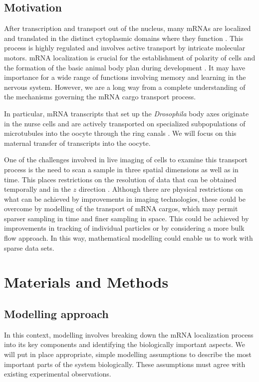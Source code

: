 \documentclass[twocolumn]{biophys}
\begin{document}
\subsection{Motivation}
After transcription and transport out of the nucleus, many mRNAs are localized and translated in the distinct cytoplasmic domains where they function \citep{jansen2001mrna, parton2014subcellular}.
This process is highly regulated and involves active transport by intricate molecular motors.
mRNA localization is crucial for the establishment of polarity of cells and the formation of the basic animal body plan during development \citep{wolpert1998}. 
It may have importance for a wide range of functions involving memory and learning in the nervous system. 
However, we are a long way from a complete understanding of the mechanisms governing the mRNA cargo transport process.

In particular, mRNA transcripts that set up the \textit{Drosophila} body axes originate in the nurse cells and are actively transported on specialized subpopulations of microtubules into the oocyte through the ring canals \citep{clark2007dynein}.
We will focus on this maternal transfer of transcripts into the oocyte.

One of the challenges involved in live imaging of cells to examine this transport process is the need to scan a sample in three spatial dimensions as well as in time.
This places restrictions on the resolution of data that can be obtained temporally and in the $z$ direction \citep{weil2010making}.
Although there are physical restrictions on what can be achieved by improvements in imaging technologies, these could be overcome by modelling of the transport of mRNA cargos, which may permit sparser sampling in time and finer sampling in space.
This could be achieved by improvements in tracking of individual particles or by considering a more bulk flow approach.
In this way, mathematical modelling could enable us to work with sparse data sets.

\section{Materials and Methods}
\subsection{Modelling approach}
In this context, modelling involves breaking down the mRNA localization process into its key components and identifying the biologically important aspects. 
We will put in place appropriate, simple modelling assumptions to describe the most important parts of the system biologically.
These assumptions must agree with existing experimental observations.
\end{document}
